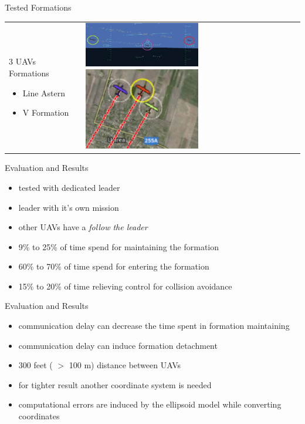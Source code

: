 \documentclass{beamer}
\begin{document}
\begin{frame}{Tested Formations}

\begin{tabular}{l l}
\begin{minipage}{0.5\textwidth}
3 UAVs Formations
\begin{itemize}
\item{Line Astern}
\item{V Formation}
\end{itemize}\end{minipage}
&
\begin{minipage}{0.5\textwidth}
\includegraphics[width=2in]{img/line2.png}
\newline
\includegraphics[width=2in]{img/vqgc.png}
\end{minipage}
\end{tabular}
\end{frame}

\begin{frame}{Evaluation and Results}
\begin{itemize}
\item tested with dedicated leader
\item leader with it's own mission
\item other UAVs have a \textit{follow the leader}
\item 9\% to 25\% of time spend for maintaining the formation
\item 60\% to 70\% of time spend for entering the formation
\item 15\% to 20\% of time relieving control for collision avoidance
\end{itemize}
\end{frame}

\begin{frame}{Evaluation and Results}
\begin{itemize}
\item communication delay can decrease the time spent in formation maintaining
\item communication delay can induce formation detachment
\item 300 feet ( $>$ 100 m) distance between UAVs
\item for tighter result another coordinate system is needed
\item computational errors are induced by the ellipsoid model while converting coordinates
\end{itemize}
\end{frame}
\end{document}
